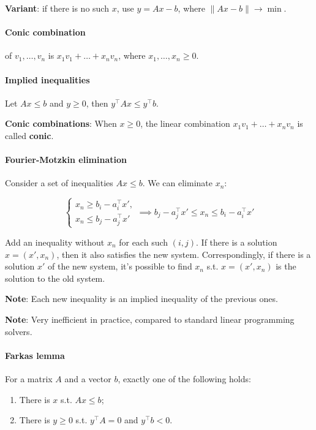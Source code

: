 \documentclass{article}
\begin{document}
\textbf{Variant}: if there is no such $x$, use $y = Ax-b$, where $\|Ax-b\| \to \min$.

\paragraph{Conic combination} of $v_1,\dots,v_n$ is $x_1 v_1 + \dots + x_n v_n$, where $x_1,\dots,x_n \geq 0$.

\paragraph{Implied inequalities} Let $Ax \leq b$ and $y \geq 0$, then $y^\top Ax \leq y^\top b$.

\textbf{Conic combinations}: When $x \geq 0$, the linear combination $x_1 v_1 + \dots + x_n v_n$ is called \textbf{conic}.

\paragraph{Fourier-Motzkin elimination} Consider a set of inequalities $Ax \leq b$. We can eliminate $x_n$:

$$
\begin{cases}
    x_n \geq b_i -a_i^\top x', \\
    x_n \leq b_j - a_j^\top x'
\end{cases} \implies b_j - a_j^\top x' \leq x_n \leq b_i - a_i^\top x'
$$

Add an inequality without $x_n$ for each such $(i, j)$. If there is a solution $x=(x',x_n)$, then it also satisfies the new system. Correspondingly, if there is a solution $x'$ of the new system, it's possible to find $x_n$ s.t. $x=(x',x_n)$ is the solution to the old system.

\textbf{Note}: Each new inequality is an implied inequality of the previous ones.

\textbf{Note}: Very inefficient in practice, compared to standard linear programming solvers.

\paragraph{Farkas lemma} For a matrix $A$ and a vector $b$, exactly one of the following holds:

\begin{enumerate}
    \item There is $x$ s.t. $Ax \leq b$;
    \item There is $y \geq 0$ s.t. $y^\top A = 0$ and $y^\top b < 0$.
\end{enumerate}
\end{document}

